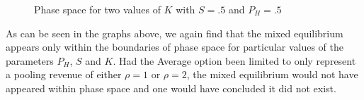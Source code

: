 \documentclass[a4paper,10pt]{article}
\numberwithin{equation}{section}
\begin{document}
\begin{figure}[h]
\begin{center}
\hfill
{}
\end{center}
\caption{Phase space for two values of $K$ with $S=.5$ and $P_H=.5$}
\label{fig:Graph12.png and fig:Graph13.png}
\end{figure}

As can be seen in the graphs above, we again find that the mixed equilibrium appears only within the boundaries of phase space for particular values of the parameters $P_H$, $S$ and $K$. Had the Average option been limited to only represent a pooling revenue of either $\rho=1$ or $\rho=2$, the mixed equilibrium would not have appeared within phase space and one would have concluded it did not exist.
\end{document}
